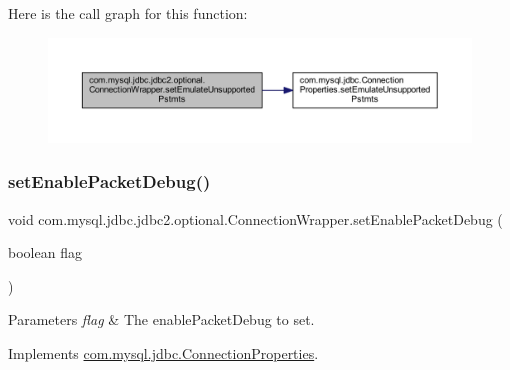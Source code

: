 Here is the call graph for this function\+:
\nopagebreak
\begin{figure}[H]
\begin{center}
\leavevmode
\includegraphics[width=350pt]{classcom_1_1mysql_1_1jdbc_1_1jdbc2_1_1optional_1_1_connection_wrapper_a44f6dda9f93deaa617804ab20b7790d1_cgraph}
\end{center}
\end{figure}
\mbox{\label{classcom_1_1mysql_1_1jdbc_1_1jdbc2_1_1optional_1_1_connection_wrapper_a8aa46e9a081e1832ae682449584a218e}} 
\subsubsection{\texorpdfstring{set\+Enable\+Packet\+Debug()}{setEnablePacketDebug()}}
{\footnotesize\ttfamily void com.\+mysql.\+jdbc.\+jdbc2.\+optional.\+Connection\+Wrapper.\+set\+Enable\+Packet\+Debug (\begin{DoxyParamCaption}\item[{boolean}]{flag }\end{DoxyParamCaption})}


\begin{DoxyParams}{Parameters}
{\em flag} & The enable\+Packet\+Debug to set. \\
\hline
\end{DoxyParams}


Implements \mbox{\hyperlink{interfacecom_1_1mysql_1_1jdbc_1_1_connection_properties_a544989b319bc9a8c941c8c969011fcb5}{com.\+mysql.\+jdbc.\+Connection\+Properties}}.

